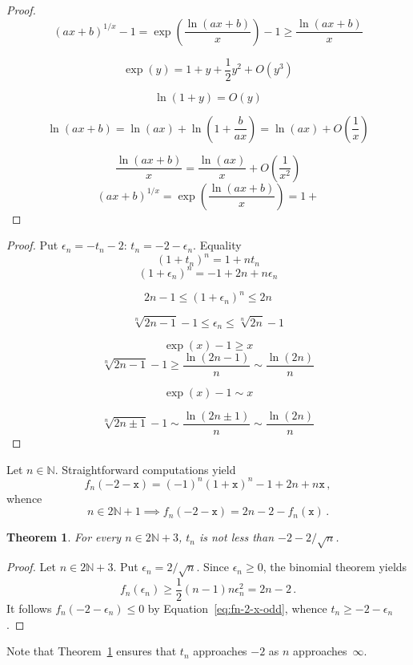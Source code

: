 \documentclass[12pt]{article}
\newcommand{\bN}{\mathbb{N}}
\newcommand{\ttx}{\mathtt{x}}
\newtheorem{theorem}{Theorem}
\begin{document}
\begin{proof}
  
  $$
  {(a x + b)}^{1 / x} - 1 = \exp \left( \frac{\ln (a x + b)}{x} \right) - 1 \ge   \frac{\ln (a x + b)}{x} 
  $$
  
  $$
  \exp(y) = 1 + y + \frac{1}{2} y^2 + O(y^3)  
  $$

  $$
  \ln(1 + y) = O(y) 
  $$

  $$
  \ln(a x + b) = \ln (a x) + \ln \left(1 +  \frac{b}{a x} \right) = \ln(a x) + O \left( \frac{1} {x} \right)
  $$

  $$
   \frac{\ln(ax + b)}{x} = \frac{\ln(a x)}{x} + O \left( \frac{1}{x^2} \right)
  $$
  $$
  {(a x + b)}^{1 / x} = \exp \left( \frac{\ln( a x + b)}{x}  \right) = 1 + 
  $$
\end{proof} 

\begin{proof}
  Put $\epsilon_n = - t_n - 2$: $t_n = - 2 - \epsilon_n$.
  Equality
  $$
  {(1 + t_n)}^n = 1 + n t_n 
  $$
  $$
   {(1 + \epsilon_n)}^n  = - 1 + 2 n + n \epsilon_n 
   $$

   $$
   2 n - 1 \le {(1 + \epsilon_n)}^n  \le  2 n 
   $$

   $$
   \sqrt[n]{2 n - 1} - 1 \le \epsilon_n  \le \sqrt[n]{2 n} - 1
   $$

   $$
   \exp(x) - 1 \ge x
   $$
   $$
   \sqrt[n]{2n - 1} - 1 \ge \frac{\ln(2n - 1)}{n} \sim \frac{\ln(2n)}{n} 
   $$

   $$
   \exp(x) - 1 \sim  x
   $$
   
   $$
   \sqrt[n]{2n \pm 1} - 1 \sim \frac{\ln(2n \pm 1)}{n} \sim \frac{\ln(2n)}{n} 
   $$
   
\end{proof}
Let $n \in \bN$.
Straightforward computations yield
$$
f_n(- 2 - \ttx) = {(- 1)}^n {(1 + \ttx)}^n - 1 + 2n + n \ttx \, , 
$$
whence 
\begin{equation} \label{eq:fn-2-x-odd}
  n \in 2 \bN + 1
  \implies 
 f_n(- 2 - \ttx) = 2n - 2 - f_n(\ttx)   \, .
\end{equation} 
 
\begin{theorem} \label{thm:lower-sqrt}
  For every $n \in 2 \bN + 3$, $t_n$ is not less than $- 2 - 2 / \sqrt{n}$.
\end{theorem}

\begin{proof}
  Let $n \in 2 \bN + 3$.
 Put $\epsilon_n = 2 / \sqrt{n}$.
  Since $\epsilon_n \ge 0$,
  the binomial theorem yields
  $$
  f_n(\epsilon_n ) \ge \frac{1}{2} (n - 1) n \epsilon_n^2 = 2 n - 2 \,.
  $$
  It follows $f_n(- 2 - \epsilon_n) \le 0$ by Equation~\eqref{eq:fn-2-x-odd}, whence $t_n \ge - 2 - \epsilon_n$.
\end{proof} 

Note that Theorem~\ref{thm:lower-sqrt} ensures that $t_n$ approaches $- 2$ as $n$ approaches~$\infty$.


 
  
\end{document}
